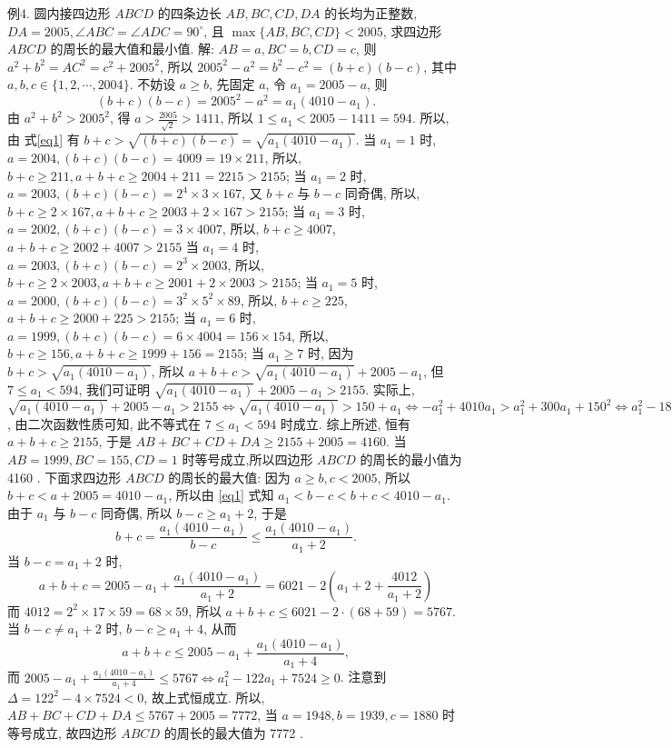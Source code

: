 例4. 圆内接四边形 $A B C D$ 的四条边长 $A B, B C, C D, D A$ 的长均为正整数, $D A=2005, \angle A B C=\angle A D C=90^{\circ}$, 且 $\max \{A B, B C, C D\}<2005$, 求四边形 $A B C D$ 的周长的最大值和最小值.
解: $A B=a, B C=b, C D=c$, 则 $a^2+b^2=A C^2=c^2+2005^2$, 所以 $2005^2-a^2=b^2-c^2=(b+c)(b-c)$, 其中 $a, b, c \in\{1,2, \cdots, 2004\}$.
不妨设 $a \geqslant b$, 先固定 $a$, 令 $a_1=2005-a$, 则
$$
(b+c)(b-c)=2005^2-a^2=a_1\left(4010-a_1\right) . \label{eq1}
$$
由 $a^2+b^2>2005^2$, 得 $a>\frac{2005}{\sqrt{2}}>1411$, 所以 $1 \leqslant a_1<2005-1411=594$.
所以, 由 式\ref{eq1} 有 $b+c>\sqrt{(b+c)(b-c)}=\sqrt{a_1\left(4010-a_1\right)}$.
当 $a_1=1$ 时, $a=2004,(b+c)(b-c)=4009=19 \times 211$, 所以, $b+c \geqslant 211, a+b+c \geqslant 2004+211=2215>2155$;
当 $a_1=2$ 时, $a=2003,(b+c)(b-c)=2^4 \times 3 \times 167$, 又 $b+c$ 与 $b-c$ 同奇偶, 所以, $b+c \geqslant 2 \times 167, a+b+c \geqslant 2003+2 \times 167>2155$;
当 $a_1=3$ 时, $a=2002,(b+c)(b-c)=3 \times 4007$, 所以, $b+c \geqslant 4007$, $a+b+c \geqslant 2002+4007>2155$
当 $a_1=4$ 时, $a=2003 ,(b+c)(b-c)=2^3 \times 2003$, 所以, $b+c \geqslant 2 \times 2003, a+b+c \geqslant 2001+2 \times 2003>2155$;
当 $a_1=5$ 时, $a=2000,(b+c)(b-c)=3^2 \times 5^2 \times 89$, 所以, $b+c \geqslant 225$, $a+b+c \geqslant 2000+225>2155$;
当 $a_1=6$ 时, $a=1999,(b+c)(b-c)=6 \times 4004=156 \times 154$, 所以, $b+c \geqslant 156, a+b+c \geqslant 1999+156=2155$;
当 $a_1 \geqslant 7$ 时, 因为 $b+c>\sqrt{a_1\left(4010-a_1\right)}$, 所以 $a+b+c> \sqrt{a_1\left(4010-a_1\right)}+2005-a_1$, 但 $7 \leqslant a_1<594$, 我们可证明 $\sqrt{a_1\left(4010-a_1\right)} +2005-a_1>2155$.
实际上, $\sqrt{a_1\left(4010-a_1\right)}+2005-a_1>2155 \Leftrightarrow \sqrt{a_1\left(4010-a_1\right)}> 150+a_1 \Leftrightarrow-a_1^2+4010 a_1>a_1^2+300 a_1+150^2 \Leftrightarrow a_1^2-1855 a_1+11250<0$, 由二次函数性质可知, 此不等式在 $7 \leqslant a_1<594$ 时成立.
综上所述, 恒有 $a+b+c \geqslant 2155$, 于是 $A B+B C+C D+D A \geqslant 2155+ 2005=4160$.
当 $A B=1999, B C=155, C D=1$ 时等号成立,所以四边形 $A B C D$ 的周长的最小值为 4160 .
下面求四边形 $A B C D$ 的周长的最大值:
因为 $a \geqslant b, c<2005$, 所以 $b+c<a+2005=4010-a_1$, 所以由 \ref{eq1} 式知 $a_1<b-c<b+c<4010-a_1$.
由于 $a_1$ 与 $b-c$ 同奇偶, 所以 $b-c \geqslant a_1+2$, 于是
$$
b+c=\frac{a_1\left(4010-a_1\right)}{b-c} \leqslant \frac{a_1\left(4010-a_1\right)}{a_1+2} .
$$
当 $b-c=a_1+2$ 时,
$$
a+b+c=2005-a_1+\frac{a_1\left(4010-a_1\right)}{a_1+2}=6021-2\left(a_1+2+\frac{4012}{a_1+2}\right)
$$
而 $4012=2^2 \times 17 \times 59=68 \times 59$, 所以 $a+b+c \leqslant 6021-2 \cdot(68+59)=5767$.
当 $b-c \neq a_1+2$ 时, $b-c \geqslant a_1+4$, 从而
$$
a+b+c \leqslant 2005-a_1+\frac{a_1\left(4010-a_1\right)}{a_1+4},
$$
而 $2005-a_1+\frac{a_1\left(4010-a_1\right)}{a_1+4} \leqslant 5767 \Leftrightarrow a_1^2-122 a_1+7524 \geqslant 0$.
注意到 $\Delta=122^2-4 \times 7524<0$, 故上式恒成立.
所以, $A B+B C+C D+D A \leqslant 5767+2005=7772$, 当 $a=1948, b= 1939, c=1880$ 时等号成立, 故四边形 $A B C D$ 的周长的最大值为 7772 .


